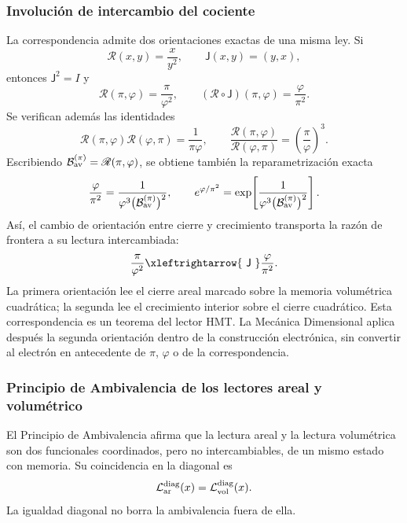 \subsubsection{Involución de intercambio del cociente}
\label{sec:espejo-pi-phi-electron-hmt}

La correspondencia admite dos orientaciones exactas de una misma ley. Si
\[
 \mathscr R(x,y)=\frac{x}{y^2},
 \qquad
 \mathsf J(x,y)=(y,x),
\]
entonces \(\mathsf J^2=I\) y
\[
 \mathscr R(\pi,\varphi)=\frac{\pi}{\varphi^2},
 \qquad
 (\mathscr R\circ\mathsf J)(\pi,\varphi)
 =\frac{\varphi}{\pi^2}.
\]
Se verifican además las identidades
\[
 \mathscr R(\pi,\varphi)\mathscr R(\varphi,\pi)
 =\frac1{\pi\varphi},
 \qquad
 \frac{\mathscr R(\pi,\varphi)}
 {\mathscr R(\varphi,\pi)}
 =\left(\frac{\pi}{\varphi}\right)^3.
\]
Escribiendo
\(\mathcal B_{\rm av}^{(\pi)}=\mathscr R(\pi,\varphi)\), se obtiene
también la reparametrización exacta
\[
 \frac{\varphi}{\pi^2}
 =
 \frac1{\varphi^3
 \bigl(\mathcal B_{\rm av}^{(\pi)}\bigr)^2},
 \qquad
 e^{\varphi/\pi^2}
 =
 \exp\!\left[
 \frac1{\varphi^3
 \bigl(\mathcal B_{\rm av}^{(\pi)}\bigr)^2}
 \right].
\]
Así, el cambio de orientación entre cierre y crecimiento transporta la
razón de frontera a su lectura intercambiada:
\[
 \frac{\pi}{\varphi^2}
 \xleftrightarrow{\ \mathsf J\ }
 \frac{\varphi}{\pi^2}.
\]
La primera orientación lee el cierre areal marcado sobre la memoria
volumétrica cuadrática; la segunda lee el crecimiento interior sobre el
cierre cuadrático. Esta correspondencia es un teorema del lector HMT. La
Mecánica Dimensional aplica después la segunda orientación dentro de la
construcción electrónica, sin convertir al electrón en antecedente de
\(\pi\), \(\varphi\) o de la correspondencia.

\subsubsection{Principio de Ambivalencia de los lectores areal y volumétrico}
\label{sec:ambivalencia-grav-inercial-pi-phi2}

El Principio de Ambivalencia afirma que la lectura areal y la lectura
volumétrica son dos funcionales coordinados, pero no intercambiables, de un
mismo estado con memoria. Su coincidencia en la diagonal es
\[
 \mathcal L_{\rm ar}^{\rm diag}(x)
 =\mathcal L_{\rm vol}^{\rm diag}(x).
\]
La igualdad diagonal no borra la ambivalencia fuera de ella.

